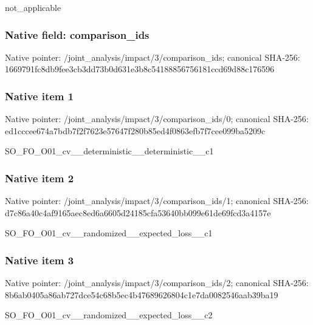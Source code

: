 \documentclass[10pt,a4paper]{article}
\begin{document}
\begingroup\raggedright\sloppy not\_\allowbreak{}applicable\par\endgroup

\subsubsection{Native field: comparison\_\allowbreak{}ids}
Native pointer: /joint\_\allowbreak{}analysis/impact/3/comparison\_\allowbreak{}ids; canonical SHA-256: 1669791fc8db9fee3cb3dd73b0d631e3b8c54188856756181ccd69d88c176596

\subsubsection{Native item 1}
Native pointer: /joint\_\allowbreak{}analysis/impact/3/comparison\_\allowbreak{}ids/0; canonical SHA-256: ed1cccee674a7bdb7f2f7623e57647f280b85ed4f0863efb7f7cee099ba5209c

\begingroup\raggedright\sloppy SO\_\allowbreak{}FO\_\allowbreak{}O01\_\allowbreak{}cv\_\allowbreak{}\_\allowbreak{}deterministic\_\allowbreak{}\_\allowbreak{}deterministic\_\allowbreak{}\_\allowbreak{}c1\par\endgroup

\subsubsection{Native item 2}
Native pointer: /joint\_\allowbreak{}analysis/impact/3/comparison\_\allowbreak{}ids/1; canonical SHA-256: d7c86a40c4af9165aec8ed6a6605d24185cfa53640bb099e61de69fcd3a4157e

\begingroup\raggedright\sloppy SO\_\allowbreak{}FO\_\allowbreak{}O01\_\allowbreak{}cv\_\allowbreak{}\_\allowbreak{}randomized\_\allowbreak{}\_\allowbreak{}expected\_\allowbreak{}loss\_\allowbreak{}\_\allowbreak{}c1\par\endgroup

\subsubsection{Native item 3}
Native pointer: /joint\_\allowbreak{}analysis/impact/3/comparison\_\allowbreak{}ids/2; canonical SHA-256: 8b6ab0405a86ab727dce54c68b5ec4b47689626804c1e7da0082546aab39ba19

\begingroup\raggedright\sloppy SO\_\allowbreak{}FO\_\allowbreak{}O01\_\allowbreak{}cv\_\allowbreak{}\_\allowbreak{}randomized\_\allowbreak{}\_\allowbreak{}expected\_\allowbreak{}loss\_\allowbreak{}\_\allowbreak{}c2\par\endgroup
\end{document}
